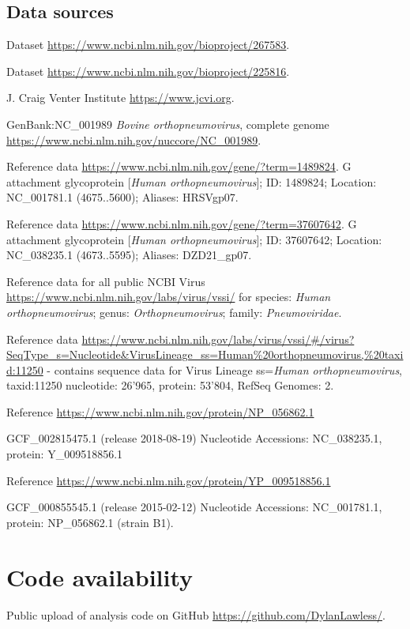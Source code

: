 \documentclass{article} %
\begin{document}
\subsection{Data sources}
\begin{description}[noitemsep]
\item Dataset \url{https://www.ncbi.nlm.nih.gov/bioproject/267583}.
\item Dataset \url{https://www.ncbi.nlm.nih.gov/bioproject/225816}.
\item J. Craig Venter Institute \url{https://www.jcvi.org}.
\item GenBank:NC\_001989 \textit{Bovine orthopneumovirus}, complete genome \url{https://www.ncbi.nlm.nih.gov/nuccore/NC_001989}.
\item Reference data \url{https://www.ncbi.nlm.nih.gov/gene/?term=1489824}.
G attachment glycoprotein [\textit{Human orthopneumovirus}]; ID: 1489824; Location: NC\_001781.1 (4675..5600); Aliases: HRSVgp07.
\item Reference data \url{https://www.ncbi.nlm.nih.gov/gene/?term=37607642}. 
G attachment glycoprotein [\textit{Human orthopneumovirus}]; ID: 37607642; Location: NC\_038235.1 (4673..5595); Aliases: DZD21\_gp07.
\item Reference data for all public NCBI Virus 
\url{https://www.ncbi.nlm.nih.gov/labs/virus/vssi/} for species: \textit{Human orthopneumovirus}; genus: \textit{Orthopneumovirus}; family: \textit{Pneumoviridae}.
\item Reference data \url{https://www.ncbi.nlm.nih.gov/labs/virus/vssi/#/virus?SeqType_s=Nucleotide&VirusLineage_ss=Human\%20orthopneumovirus,\%20taxid:11250}
- contains sequence data for 
Virus Lineage ss=\textit{Human orthopneumovirus}, taxid:11250
nucleotide: 26’965, 
protein: 53’804, 
RefSeq Genomes: 2.
\item Reference \url{https://www.ncbi.nlm.nih.gov/protein/NP_056862.1}
\item GCF\_002815475.1	(release 2018-08-19) Nucleotide Accessions: NC\_038235.1, protein: Y\_009518856.1
\item Reference \url{https://www.ncbi.nlm.nih.gov/protein/YP_009518856.1}
\item GCF\_000855545.1	(release 2015-02-12) Nucleotide Accessions: NC\_001781.1, protein: NP\_056862.1 (strain B1).
\end{description}

\section{Code availability}
Public upload of analysis code on GitHub \url{https://github.com/DylanLawless/}.
\end{document}
